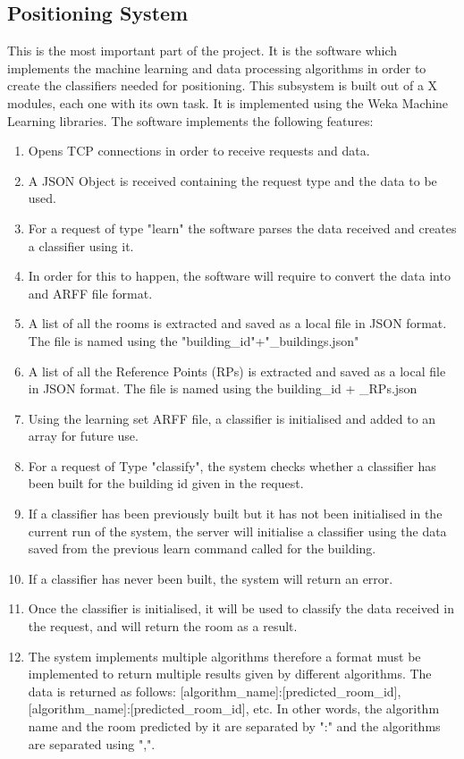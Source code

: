 \subsection{Positioning System}
This is the most important part of the project. It is the software which implements the machine learning and data processing algorithms in order to create the classifiers needed for positioning.
This subsystem is built out of a X modules, each one with its own task. It is implemented using the Weka Machine Learning libraries. The software implements the following features:
\begin{enumerate}
\item Opens TCP connections in order to receive requests and data.
\item A JSON Object is received containing the request type and the data to be used.
\item For a request of type "learn" the software parses the data received and creates a classifier using it.
\item In order for this to happen, the software will require to convert the data into and ARFF file format.
\item A list of all the rooms is extracted and saved as a local file in JSON format. The file is named using the "building\_id"+"\_buildings.json"
\item A list of all the Reference Points (RPs) is extracted and saved as a local file in JSON format. The file is named using the building\_id + \_RPs.json
\item Using the learning set ARFF file, a classifier is initialised and added to an array for future use.
\item For a request of Type "classify", the system checks whether a classifier has been built for the building id given in the request.
\item If a classifier has been previously built but it has not been initialised in the current run of the system, the server will initialise a classifier using the data saved from the previous learn command called for the building.
\item If a classifier has never been built, the system will return an error.
\item Once the classifier is initialised, it will be used to classify the data received in the request, and will return the room as a result.
\item The system implements multiple algorithms therefore a format must be implemented to return multiple results given by different algorithms. The data is returned as follows: [algorithm\_name]:[predicted\_room\_id],[algorithm\_name]:[predicted\_room\_id], etc. In other words, the algorithm name and the room predicted by it are separated by ":" and the algorithms are separated using ",".
\end{enumerate}


